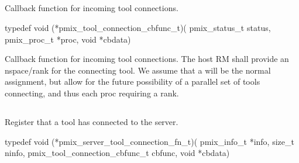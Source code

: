 \subsection{}

\summary

Callback function for incoming tool connections.

\format

\cspecificstart
\begin{codepar}
typedef void (*pmix_tool_connection_cbfunc_t)(
                    pmix_status_t status,
                    pmix_proc_t *proc, void *cbdata)
\end{codepar}
\cspecificend

\begin{arglist}
\end{arglist}

\descr

Callback function for incoming tool connections.
The host RM shall provide an nspace/rank for the connecting tool.
We assume that a  will be the normal assignment, but allow for the future possibility of a parallel set of tools connecting, and thus each proc requiring a rank.


\subsection{}

\summary

Register that a tool has connected to the server.

\format

\cspecificstart
\begin{codepar}
typedef void (*pmix_server_tool_connection_fn_t)(
                    pmix_info_t *info, size_t ninfo,
                    pmix_tool_connection_cbfunc_t cbfunc,
                    void *cbdata)
\end{codepar}
\cspecificend

\begin{arglist}
\end{arglist}

